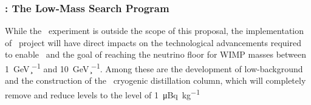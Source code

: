 \subsubsection{\DSl: The Low-Mass Search Program}
\label{sec:DSl}

While the \DSls\ experiment is outside the scope of this proposal, the implementation of \DSk\ project will have direct impacts on the technological advancements required to enable \DSls\ and the goal of reaching the neutrino floor for WIMP masses between \SI{1}{\GeV\per\c\squared} and \SI{10}{\GeV\per\c\squared}. Among these are the development of low-background \DSkPdms~\cite{DIncecco:2018fx,DIncecco:2018hy} and the construction of the \Aria\ cryogenic distillation column, which will completely remove  and reduce  levels to the level of \SI{1}{\micro\becquerel\per\kg}


